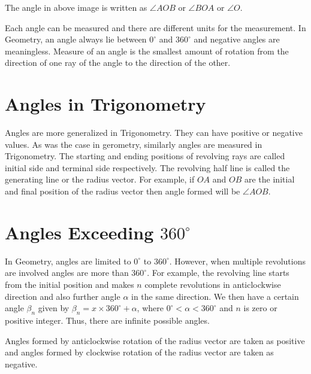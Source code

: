 The angle in above image is written as $\angle AOB$ or $\angle BOA$ or $\angle O$.

Each angle can be measured and there are different units for the measurement. In Geometry, an angle always lie between $0^\circ$
and $360^\circ$ and negative angles are meaningless. Measure of an angle is the smallest amount of rotation from the direction of
one ray of the angle to the direction of the other.

\section{Angles in Trigonometry}
Angles are more generalized in Trigonometry. They can have positive or negative values. As was the case in gerometry, similarly
angles are measured in Trigonometry. The starting and ending positions of revolving rays are called initial side and terminal side
respectively. The revolving half line is called the generating line or the radius vector. For example, if $OA$ and $OB$ are the
initial and final position of the radius vector then angle formed will be $\angle AOB$.

\section{Angles Exceeding $360^\circ$}
\begin{center}
\end{center}

In Geometry, angles are limited to $0^\circ$ to $360^\circ$. However, when multiple revolutions are involved angles are more than
$360^\circ$. For example, the revolving line starts from the initial position and makes $n$ complete revolutions in anticlockwise
direction and also further angle $\alpha$ in the same direction. We then have a certain angle $\beta_n$ given by $\beta_n =
x\times360^\circ + \alpha$, where $0^\circ< \alpha < 360^\circ$ and $n$ is zero or positive integer. Thus, there are infinite
possible angles.

Angles formed by anticlockwise rotation of the radius vector are taken as positive and angles formed by clockwise rotation of the
radius vector are taken as negative.

